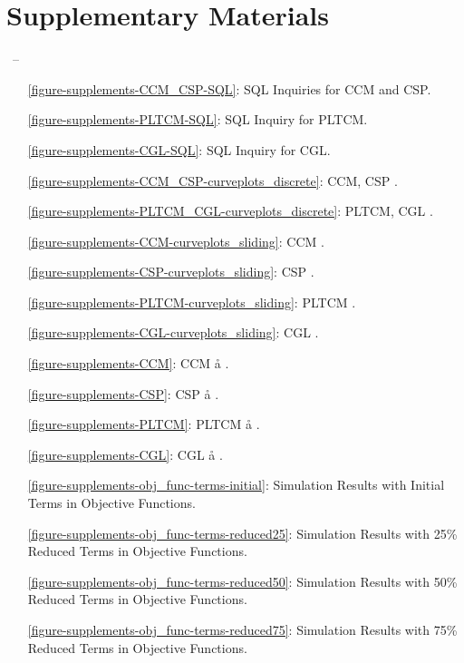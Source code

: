 \chapter*{Supplementary Materials}\label{Supp_first}
%
{\thepage\ -- \pageref{LastPage}}
\captionsetup{list=no}
\thispagestyle{plain}
\begin{itemize}
	\item[\ref{figure-supplements-CCM_CSP-SQL}:] SQL Inquiries for CCM and CSP.
	\item[\ref{figure-supplements-PLTCM-SQL}:] SQL Inquiry for PLTCM.
	\item[\ref{figure-supplements-CGL-SQL}:] SQL Inquiry for CGL.
	\item[\ref{figure-supplements-CCM_CSP-curveplots_discrete}:] CCM, CSP \cc{} \ee{}.
	\item[\ref{figure-supplements-PLTCM_CGL-curveplots_discrete}:] PLTCM, CGL \cc{} \ee{}.
	\item[\ref{figure-supplements-CCM-curveplots_sliding}:] CCM \cc{} \dd{}.
	\item[\ref{figure-supplements-CSP-curveplots_sliding}:] CSP \cc{} \dd{}.
	\item[\ref{figure-supplements-PLTCM-curveplots_sliding}:] PLTCM \cc{} \dd{}.
	\item[\ref{figure-supplements-CGL-curveplots_sliding}:] CGL \cc{} \dd{}.
	\item[\ref{figure-supplements-CCM}:] CCM \aa{} \bb{}.
	\item[\ref{figure-supplements-CSP}:] CSP \aa{} \bb{}.
	\item[\ref{figure-supplements-PLTCM}:] PLTCM \aa{} \bb{}.
	\item[\ref{figure-supplements-CGL}:] CGL \aa{} \bb{}.
	\item[\ref{figure-supplements-obj_func-terms-initial}:] Simulation Results with Initial Terms in Objective Functions.
	\item[\ref{figure-supplements-obj_func-terms-reduced25}:] Simulation Results with 25\% Reduced Terms in Objective Functions.
	\item[\ref{figure-supplements-obj_func-terms-reduced50}:] Simulation Results with 50\% Reduced Terms in Objective Functions.
	\item[\ref{figure-supplements-obj_func-terms-reduced75}:] Simulation Results with 75\% Reduced Terms in Objective Functions.
\end{itemize}
\clearpage


